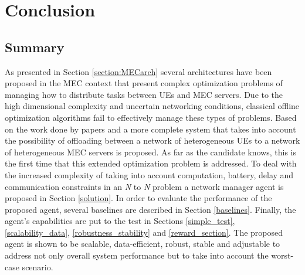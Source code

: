 \documentclass[conference]{IEEEtran}
\begin{document}
\section{Conclusion}
\label{sec:conclusion}

\subsection{Summary}
\noindent As presented in Section \ref{section:MECarch} several architectures have been proposed in the \acrshort{MEC} context that present complex optimization problems of managing how to distribute tasks between \acrshort{UE}s and \acrshort{MEC} servers. Due to the high dimensional complexity and uncertain networking conditions, classical offline optimization algorithms fail to effectively manage these types of problems. Based on the work done by papers \cite{taskclass1} and \cite{NUE1mec} a more complete system that takes into account the possibility of offloading between a network of heterogeneous \acrshort{UE}s to a network of heterogeneous \acrshort{MEC} servers is proposed. As far as the candidate knows, this is the first time that this extended optimization problem is addressed. To deal with the increased complexity of taking into account computation, battery, delay and communication constraints in an \emph{N} to \emph{N} problem a network manager agent is proposed in Section \ref{solution}. In order to evaluate the performance of the proposed agent, several baselines are described in Section \ref{baselines}. Finally, the agent's capabilities are put to the test in Sections \ref{simple_test}, \ref{scalability_data}, \ref{robustness_stability} and \ref{reward_section}. The proposed agent is shown to be scalable, data-efficient, robust, stable and adjustable to address not only overall system performance but to take into account the worst-case scenario.
\end{document}
